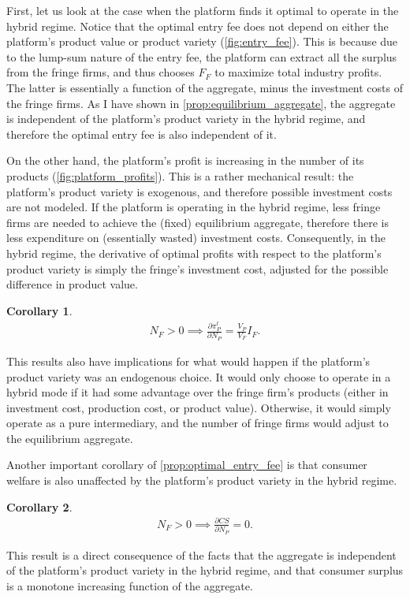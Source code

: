 \documentclass[a4paper]{article}
\newtheorem{corollary}{Corollary}
\begin{document}
First, let us look at the case when the platform finds it optimal to operate in the hybrid regime.
Notice that the optimal entry fee does not depend on either the platform's product value or product variety (\cref{fig:entry_fee}).
This is because due to the lump-sum nature of the entry fee, the platform can extract all the surplus from the fringe firms, and thus chooses $F_F$ to maximize total industry profits.
The latter is essentially a function of the aggregate, minus the investment costs of the fringe firms.
As I have shown in \cref{prop:equilibrium_aggregate}, the aggregate is independent of the platform's product variety in the hybrid regime, and therefore the optimal entry fee is also independent of it.

On the other hand, the platform's profit is increasing in the number of its products (\cref{fig:platform_profits}).
This is a rather mechanical result: the platform's product variety is exogenous, and therefore possible investment costs are not modeled.
If the platform is operating in the hybrid regime, less fringe firms are needed to achieve the (fixed) equilibrium aggregate, therefore there is less expenditure on (essentially wasted) investment costs.
Consequently, in the hybrid regime, the derivative of optimal profits with respect to the platform's product variety is simply the fringe's investment cost, adjusted for the possible difference in product value.
\begin{corollary}
    \begin{align*}
        N_F > 0 \implies \frac{\partial \pi_P^t}{\partial N_P} = \frac{V_P}{V_F} I_F.
    \end{align*}
\end{corollary}
This results also have implications for what would happen if the platform's product variety was an endogenous choice.
It would only choose to operate in a hybrid mode if it had some advantage over the fringe firm's products (either in investment cost, production cost, or product value).
Otherwise, it would simply operate as a pure intermediary, and the number of fringe firms would adjust to the equilibrium aggregate.

Another important corollary of \cref{prop:optimal_entry_fee} is that consumer welfare is also unaffected by the platform's product variety in the hybrid regime.
\begin{corollary}
    \begin{align*}
        N_F > 0 \implies \frac{\partial CS}{\partial N_P} = 0.
    \end{align*}
\end{corollary}
This result is a direct consequence of the facts that the aggregate is independent of the platform's product variety in the hybrid regime, and that consumer surplus is a monotone increasing function of the aggregate.
\end{document}
